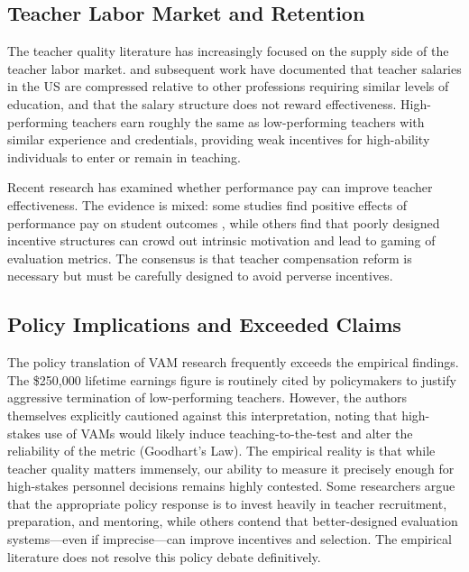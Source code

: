 \documentclass[12pt,letterpaper]{article}
\begin{document}
\subsection{Teacher Labor Market and Retention}

The teacher quality literature has increasingly focused on the supply side of the teacher labor market. \citet{hanushek2011} and subsequent work have documented that teacher salaries in the US are compressed relative to other professions requiring similar levels of education, and that the salary structure does not reward effectiveness. High-performing teachers earn roughly the same as low-performing teachers with similar experience and credentials, providing weak incentives for high-ability individuals to enter or remain in teaching.

Recent research has examined whether performance pay can improve teacher effectiveness. The evidence is mixed: some studies find positive effects of performance pay on student outcomes \citep{fryer2014}, while others find that poorly designed incentive structures can crowd out intrinsic motivation and lead to gaming of evaluation metrics. The consensus is that teacher compensation reform is necessary but must be carefully designed to avoid perverse incentives.

\subsection{Policy Implications and Exceeded Claims}

The policy translation of VAM research frequently exceeds the empirical findings. The \citet{chetty2014b} \$250,000 lifetime earnings figure is routinely cited by policymakers to justify aggressive termination of low-performing teachers. However, the authors themselves explicitly cautioned against this interpretation, noting that high-stakes use of VAMs would likely induce teaching-to-the-test and alter the reliability of the metric (Goodhart's Law). The empirical reality is that while teacher quality matters immensely, our ability to measure it precisely enough for high-stakes personnel decisions remains highly contested. Some researchers argue that the appropriate policy response is to invest heavily in teacher recruitment, preparation, and mentoring, while others contend that better-designed evaluation systems---even if imprecise---can improve incentives and selection. The empirical literature does not resolve this policy debate definitively.

\end{document}
